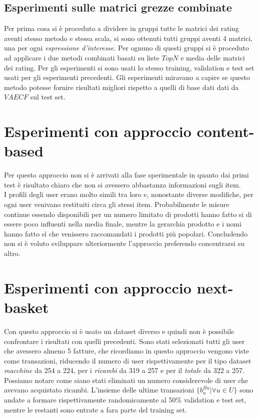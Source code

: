 \subsection{Esperimenti sulle matrici grezze combinate}
Per prima cosa si è proceduto a dividere in gruppi tutte le matrici dei rating aventi stesso metodo e stessa scala, si sono ottenuti tutti gruppi aventi 4 matrici, una per ogni \textit{espressione d'interesse}. Per ognuno di questi gruppi si è proceduto ad applicare i due metodi combinati basati su liste $TopN$ e media delle matrici dei rating. Per gli esperimenti si sono usati lo stesso training, validation e test set usati per gli esperimenti precedenti. Gli esperimenti miravano a capire se questo metodo potesse fornire risultati migliori rispetto a quelli di base dati dati da $VAECF$ sul test set.

\section{Esperimenti con approccio content-based}
Per questo approccio non si è arrivati alla fase sperimentale in quanto dai primi test è risultato chiaro che non si avessero abbastanza informazioni sugli item.\\
I profili degli user erano molto simili tra loro e, nonostante diverse modifiche, per ogni user venivano restituiti circa gli stessi item. Probabilmente le misure continue essendo disponibili per un numero limitato di prodotti hanno fatto si di essere poco influenti nella media finale, mentre la gerarchia prodotto e i nomi hanno fatto sì che venissero raccomandati i prodotti più popolari. Concludendo non si è voluto sviluppare ulteriormente l'approccio preferendo concentrarsi su altro.

\section{Esperimenti con approccio next-basket}
Con questo approccio si è usato un dataset diverso e quindi non è possibile confrontare i risultati con quelli precedenti. Sono stati selezionati tutti gli user che avessero almeno 5 fatture, che ricordiamo in questo approccio vengono viste come transazioni, riducendo il numero di user rispettivamente per il tipo dataset \textit{macchine} da 254 a 224, per i \textit{ricambi} da 319 a 257 e per il \textit{totale} da 322 a 257.\\
Possiamo notare come siano stati eliminati un numero considerevole di user che avevano acquistato ricambi. L'insieme delle ultime transazioni $\{b_{u}^{Bu}| \forall u \in U\}$ sono andate a formare rispettivamente randomicamente al 50\% validation e test set, mentre le restanti sono entrate a fara parte del training set. 

